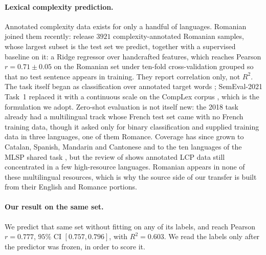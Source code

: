 \paragraph{Lexical complexity prediction.}
Annotated complexity data exists for only a handful of languages.
Romanian joined them recently: \citet{anghel-etal-2025-rals} release
$3921$ complexity-annotated Romanian samples, whose largest subset is the
test set we predict, together with a supervised baseline on it: a Ridge
regressor over handcrafted features, which reaches Pearson
$r = 0.71 \pm 0.05$ on the Romanian set under ten-fold cross-validation
grouped so that no test sentence appears in training. They report
correlation only, not $R^2$. The task
itself began as classification over
annotated target words \citep{yimam-etal-2018-report}; SemEval-2021
Task~1 replaced it with a continuous scale on the CompLex corpus
\citep{shardlow-etal-2021-semeval}, which is the formulation we adopt.
Zero-shot evaluation is not itself new: the 2018 task already had a
multilingual track whose French test set came with no French training
data, though it asked only for binary classification and supplied
training data in three languages, one of them Romance. Coverage has since
grown to
Catalan, Spanish, Mandarin and Cantonese
\citep{saggion-etal-2024-lexical, qiu-etal-2024-complex} and to the ten
languages of the MLSP shared task \citep{shardlow-etal-2024-bea}, but the
review of \citet{shardlow-etal-2024-multilingual} shows annotated LCP
data still concentrated in a few high-resource languages. Romanian
appears in none of these multilingual resources, which is why the source
side of our transfer is built from their English and Romance portions.

\paragraph{Our result on the same set.}
We predict that same set without fitting on any of its labels, and reach
Pearson $r = 0.777$, $95\%$ CI $[0.757, 0.796]$, with $R^2 = 0.603$. We
read the labels only after the predictor was frozen, in order to score
it.

